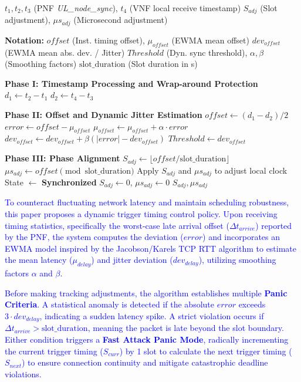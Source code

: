 \documentclass[../my_ntust_thesis.tex]{subfiles}
\begin{document}
\begin{algorithm}[H]
\caption{Adaptive Node Synchronization}
\label{alg:node_sync_simplified}
\small
\begin{algorithmic}[1]
\Require $t_1, t_2, t_3$ (PNF \textit{UL\_node\_sync}), $t_4$ (VNF local receive timestamp)
\Ensure $S_{adj}$ (Slot adjustment), $\mu s_{adj}$ (Microsecond adjustment)

\Statex \textbf{Notation:} 
\Statex $offset$ (Inst. timing offset), $\mu_{offset}$ (EWMA mean offset)
\Statex $dev_{offset}$ (EWMA mean abs. dev. / Jitter)
\Statex $Threshold$ (Dyn. sync threshold), $\alpha, \beta$ (Smoothing factors)
\Statex $\text{slot\_duration}$ (Slot duration in \textmu s)

\Statex \textbf{Phase I: Timestamp Processing and Wrap-around Protection}
\State $d_1 \gets t_2 - t_1$
\State $d_2 \gets t_4 - t_3$

\Statex \textbf{Phase II: Offset and Dynamic Jitter Estimation}
\State $offset \gets (d_1 - d_2) / 2$
\State $error \gets offset - \mu_{offset}$
\State $\mu_{offset} \gets \mu_{offset} + \alpha \cdot error$
\State $dev_{offset} \gets dev_{offset} + \beta(|error| - dev_{offset})$
\State $Threshold \gets dev_{offset}$

\Statex \textbf{Phase III: Phase Alignment}
    \State $S_{adj} \gets \lfloor offset / \text{slot\_duration} \rfloor$
    \State $\mu s_{adj} \gets offset \pmod{\text{slot\_duration}}$
    \State Apply $S_{adj}$ and $\mu s_{adj}$ to adjust local clock
\Else
    \State State $\gets$ \textbf{Synchronized}
    \State $S_{adj} \gets 0$, $\mu s_{adj} \gets 0$
\EndIf
\State \Return $S_{adj}, \mu s_{adj}$
\end{algorithmic}
\end{algorithm}

\textcolor{blue}{To counteract fluctuating network latency and maintain scheduling robustness, this paper proposes a dynamic trigger timing control policy. Upon receiving timing statistics, specifically the worst-case late arrival offset ($\Delta t_{arrive}$) reported by the PNF, the system computes the deviation ($error$) and incorporates an EWMA model inspired by the Jacobson/Karels TCP RTT algorithm to estimate the mean latency ($\mu_{delay}$) and jitter deviation ($dev_{delay}$), utilizing smoothing factors $\alpha$ and $\beta$.}

\textcolor{blue}{Before making tracking adjustments, the algorithm establishes multiple \textbf{Panic Criteria}. A statistical anomaly is detected if the absolute $error$ exceeds $3 \cdot dev_{delay}$, indicating a sudden latency spike. A strict violation occurs if $\Delta t_{arrive} > \text{slot\_duration}$, meaning the packet is late beyond the slot boundary. Either condition triggers a \textbf{Fast Attack Panic Mode}, radically incrementing the current trigger timing ($S_{curr}$) by 1 slot to calculate the next trigger timing ($S_{next}$) to ensure connection continuity and mitigate catastrophic deadline violations.}
\end{document}
